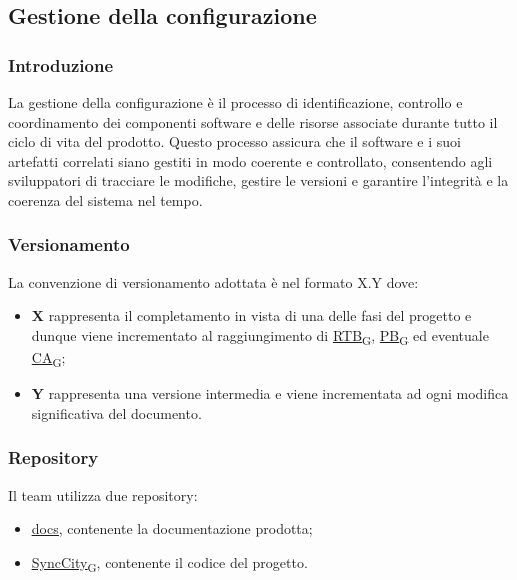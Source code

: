 \subsection{Gestione della configurazione}
\subsubsection{Introduzione}
La gestione della configurazione è il processo di identificazione, controllo e coordinamento dei componenti software e delle risorse associate durante tutto il ciclo di vita del prodotto. Questo processo assicura che il software e i suoi artefatti correlati siano gestiti in modo coerente e controllato, consentendo agli sviluppatori di tracciare le modifiche, gestire le versioni e garantire l'integrità e la coerenza del sistema nel tempo.

\subsubsection{Versionamento}
La convenzione di versionamento adottata è nel formato X.Y dove:
\begin{itemize}
	\item \textbf{X} rappresenta il completamento in vista di una delle fasi del progetto e dunque viene incrementato al raggiungimento di \href{https://7last.github.io/docs/rtb/documentazione-interna/glossario\#requirements-and-technology-baseline}{RTB\textsubscript{G}}, \href{https://7last.github.io/docs/rtb/documentazione-interna/glossario\#product-baseline}{PB\textsubscript{G}} ed eventuale \href{https://7last.github.io/docs/rtb/documentazione-interna/glossario\#customer-acceptance}{CA\textsubscript{G}};
	\item \textbf{Y} rappresenta una versione intermedia e viene incrementata ad ogni modifica significativa del documento.
\end{itemize}

\subsubsection{Repository}
Il team utilizza due repository:
\begin{itemize}
	\item \href{https://github.com/7Last/docs.git}{\underline{docs}}, contenente la documentazione prodotta;
	\item \href{https://github.com/7Last/SyncCity}{\href{https://7last.github.io/docs/rtb/documentazione-interna/glossario\#synccity}{\underline{SyncCity}\textsubscript{G}}}, contenente il codice del progetto.
\end{itemize}

